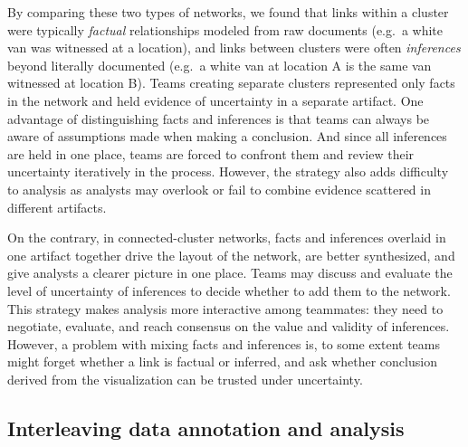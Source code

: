 
By comparing these two types of networks, we found that links within a cluster were typically
\emph{factual} relationships modeled from raw documents (e.g.~a white van was
witnessed at a location), and links between clusters were often
\emph{inferences} beyond literally documented (e.g.~a white van at location A
is the same van witnessed at location B). Teams creating separate
clusters represented only facts in the network and held evidence of
uncertainty in a separate artifact. One advantage of distinguishing
facts and inferences is that teams can always be aware of assumptions made when
making a conclusion. And since all inferences are held in one place,
teams are forced to confront them and review their uncertainty
iteratively in the process. However, the strategy also adds difficulty
to analysis as analysts may overlook or fail to combine evidence
scattered in different artifacts.

% 


On the contrary, in connected-cluster networks, facts and inferences overlaid in one artifact together drive the layout of the
network, are better synthesized, and give analysts a clearer picture in one place. Teams may discuss and evaluate the level of uncertainty of inferences to decide whether to add them to the
network. This strategy makes analysis more interactive among teammates:
they need to negotiate, evaluate, and reach consensus on the value and
validity of inferences. However, a problem with mixing facts and inferences is, to some extent teams might forget whether a
link is factual or inferred, and ask whether conclusion derived
from the visualization can be trusted under uncertainty.


\subsection{Interleaving data annotation and analysis}\label{interleaving-data-annotation-and-data-analysis}



